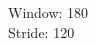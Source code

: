 \documentclass[preview]{standalone}
\begin{document}
\begin{center}
Window: 180\\Stride: 120
\end{center}
\end{document}
